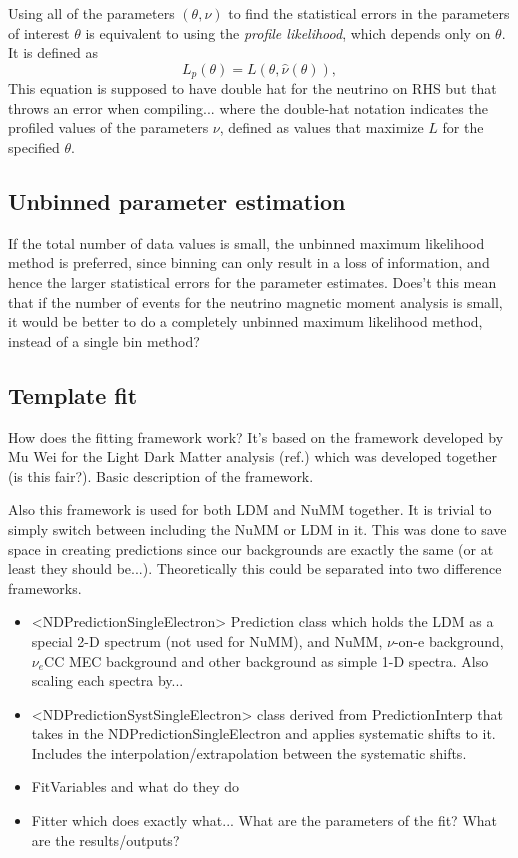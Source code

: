 Using all of the parameters $\left(\theta,\nu\right)$  to find the statistical errors in the parameters of interest $\theta$ is equivalent to using the \textit{profile likelihood}, which depends only on $\theta$. It is defined as
\begin{equation}
L_p\left(\theta\right)=L\left(\theta,\hat{\nu}\left(\theta\right)\right),
\end{equation}
This equation is supposed to have double hat for the neutrino on RHS but that throws an error when compiling...
where the double-hat notation indicates the profiled values of the parameters $\nu$, defined as values that maximize $L$ for the specified $\theta$.

\subsection{Unbinned parameter estimation}
If the total number of data values is small, the unbinned maximum likelihood method is preferred, since binning can only result in a loss of information, and hence the larger statistical errors for the parameter estimates.
Does't this mean that if the number of events for the neutrino magnetic moment analysis is small, it would be better to do a completely unbinned maximum likelihood method, instead of a single bin method?

\subsection{Template fit}
How does the fitting framework work? It's based on the framework developed by Mu Wei for the Light Dark Matter analysis (ref.) which was developed together (is this fair?). Basic description of the framework.

Also this framework is used for both LDM and NuMM together. It is trivial to simply switch between including the NuMM or LDM in it. This was done to save space in creating predictions since our backgrounds are exactly the same (or at least they should be...). Theoretically this could be separated into two difference frameworks.

\begin{itemize}
\item <NDPredictionSingleElectron> Prediction class which holds the LDM as a special 2-D spectrum (not used for NuMM), and NuMM, $\nu$-on-e background, $\nu_e$CC MEC background and other background as simple 1-D spectra. Also scaling each spectra by...
\item <NDPredictionSystSingleElectron> class derived from PredictionInterp that takes in the NDPredictionSingleElectron and applies systematic shifts to it. Includes the interpolation/extrapolation between the systematic shifts.
\item FitVariables and what do they do
\item Fitter which does exactly what... What are the parameters of the fit? What are the results/outputs?
\end{itemize}
\fi


